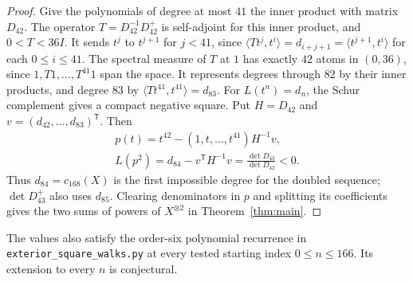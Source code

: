 \documentclass[11pt,reqno]{amsart}
\theoremstyle{definition}
\begin{document}
\begin{proof}
Give the polynomials of degree at most $41$ the inner product with
matrix $D_{42}$. The operator $T=D_{42}^{-1}D_{42}^+$ is self-adjoint
for this inner product, and $0<T<36I$. It sends $t^j$ to $t^{j+1}$ for
$j<41$, since $\langle Tt^j,t^i\rangle=d_{i+j+1}=\langle t^{j+1},t^i\rangle$ for each $0\le i\le41$. The spectral measure
of $T$ at $1$ has exactly $42$ atoms in $(0,36)$, since $1,T1,\ldots,T^{41}1$ span the space. It represents degrees through $82$ by their inner products, and degree $83$ by $\langle Tt^{41},t^{41}\rangle=d_{83}$. For $L(t^n)=d_n$, the Schur complement gives a compact negative square. Put $H=D_{42}$ and $v=(d_{42},\ldots,d_{83})^{\mathsf T}$. Then
\begin{equation}\label{eq:exterior-schur}
\begin{gathered}
 p(t)=t^{42}-(1,t,\ldots,t^{41})H^{-1}v,\\
 L(p^2)=d_{84}-v^{\mathsf T}H^{-1}v
       =\frac{\det D_{43}}{\det D_{42}}<0.
\end{gathered}
\end{equation}
Thus $d_{84}=c_{168}(X)$ is the first impossible degree for the doubled sequence; $\det D_{43}^+$ also uses $d_{85}$. Clearing denominators in $p$ and splitting its coefficients gives the two sums of powers of $X^{\otimes2}$ in Theorem~\ref{thm:main}.
\end{proof}

The values also satisfy the order-six polynomial recurrence in
\texttt{exterior\_square\_walks.py} at every tested starting index
$0\le n\le166$. Its extension to every $n$ is conjectural.
\end{document}
